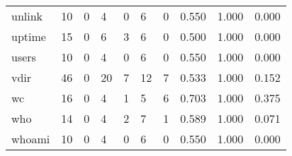 \begin{longtable}{lp{1.3cm}p{1.3cm}p{1.3cm}p{1.3cm}p{1.3cm}p{1.3cm}p{1.3cm}p{1.3cm}p{1.3cm}}
unlink    &                     10 &                                             0 &                                            4 &                                           0 &                                            6 &                                          0 &                                0.550 &                                  1.000 &                                0.000 \\
uptime    &                     15 &                                             0 &                                            6 &                                           3 &                                            6 &                                          0 &                                0.500 &                                  1.000 &                                0.000 \\
users     &                     10 &                                             0 &                                            4 &                                           0 &                                            6 &                                          0 &                                0.550 &                                  1.000 &                                0.000 \\
vdir      &                     46 &                                             0 &                                           20 &                                           7 &                                           12 &                                          7 &                                0.533 &                                  1.000 &                                0.152 \\
wc        &                     16 &                                             0 &                                            4 &                                           1 &                                            5 &                                          6 &                                0.703 &                                  1.000 &                                0.375 \\
who       &                     14 &                                             0 &                                            4 &                                           2 &                                            7 &                                          1 &                                0.589 &                                  1.000 &                                0.071 \\
whoami    &                     10 &                                             0 &                                            4 &                                           0 &                                            6 &                                          0 &                                0.550 &                                  1.000 &                                0.000 \\

\end{longtable}
